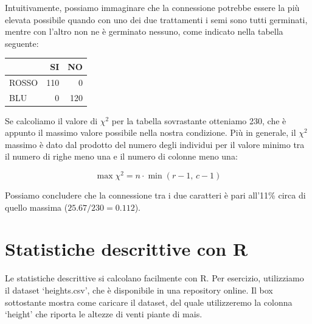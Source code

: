 \documentclass[a4paper,12pt,oneside]{book}
\newenvironment{Shaded}{\begin{snugshade}}{\end{snugshade}}
\newcommand{\SpecialCharTok}[1]{#1}
\newcommand{\StringTok}[1]{#1}
\newcommand{\DocumentationTok}[1]{#1}
\newcommand{\OtherTok}[1]{#1}
\newcommand{\FunctionTok}[1]{#1}
\newcommand{\AttributeTok}[1]{#1}
\newcommand{\NormalTok}[1]{#1}
\begin{document}
Intuitivamente, possiamo immaginare che la connessione potrebbe essere la più elevata possibile quando con uno dei due trattamenti i semi sono tutti germinati, mentre con l'altro non ne è germinato nessuno, come indicato nella tabella seguente:

\begin{tabular}{l|r|r}
\hline
  & SI & NO\\
\hline
ROSSO & 110 & 0\\
\hline
BLU & 0 & 120\\
\hline
\end{tabular}

Se calcoliamo il valore di \(\chi^2\) per la tabella sovrastante otteniamo 230, che è appunto il massimo valore possibile nella nostra condizione. Più in generale, il \(\chi^2\) massimo è dato dal prodotto del numero degli individui per il valore minimo tra il numero di righe meno una e il numero di colonne meno una:

\[\max \chi ^2  = n \cdot \min (r - 1,\,c - 1)\]

Possiamo concludere che la connessione tra i due caratteri è pari all'11\% circa di quello massima (\(25.67/230 = 0.112\)).

\hypertarget{statistiche-descrittive-con-r}{%
\section{Statistiche descrittive con R}\label{statistiche-descrittive-con-r}}

Le statistiche descrittive si calcolano facilmente con R. Per esercizio, utilizziamo il dataset `heights.csv', che è disponibile in una repository online. Il box sottostante mostra come caricare il dataset, del quale utilizzeremo la colonna `height' che riporta le altezze di venti piante di mais.

\begin{Shaded}
\end{Shaded}
\end{document}
